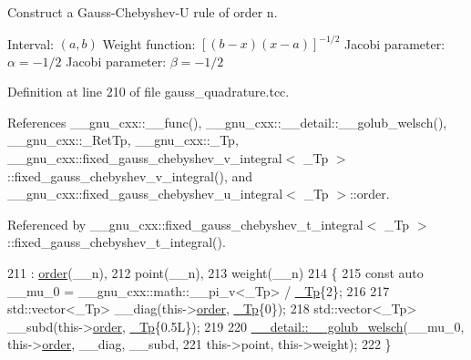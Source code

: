 Construct a Gauss-\/\+Chebyshev-\/U rule of order {\ttfamily n}.

Interval\+: $ (a, b) $ Weight function\+: $ [(b-x)(x-a)]^{-1/2} $ Jacobi parameter\+: $ \alpha = -1/2 $ Jacobi parameter\+: $ \beta = -1/2 $ 

Definition at line 210 of file gauss\+\_\+quadrature.\+tcc.



References \+\_\+\+\_\+gnu\+\_\+cxx\+::\+\_\+\+\_\+func(), \+\_\+\+\_\+gnu\+\_\+cxx\+::\+\_\+\+\_\+detail\+::\+\_\+\+\_\+golub\+\_\+welsch(), \+\_\+\+\_\+gnu\+\_\+cxx\+::\+\_\+\+Ret\+Tp, \+\_\+\+\_\+gnu\+\_\+cxx\+::\+\_\+\+Tp, \+\_\+\+\_\+gnu\+\_\+cxx\+::fixed\+\_\+gauss\+\_\+chebyshev\+\_\+v\+\_\+integral$<$ \+\_\+\+Tp $>$\+::fixed\+\_\+gauss\+\_\+chebyshev\+\_\+v\+\_\+integral(), and \+\_\+\+\_\+gnu\+\_\+cxx\+::fixed\+\_\+gauss\+\_\+chebyshev\+\_\+u\+\_\+integral$<$ \+\_\+\+Tp $>$\+::order.



Referenced by \+\_\+\+\_\+gnu\+\_\+cxx\+::fixed\+\_\+gauss\+\_\+chebyshev\+\_\+t\+\_\+integral$<$ \+\_\+\+Tp $>$\+::fixed\+\_\+gauss\+\_\+chebyshev\+\_\+t\+\_\+integral().


\begin{DoxyCode}
211     : \hyperlink{struct____gnu__cxx_1_1fixed__gauss__chebyshev__u__integral_a497180b192f0df1eb43c488537a861ca}{order}(\_\_n),
212       point(\_\_n),
213       weight(\_\_n)
214     \{
215       \textcolor{keyword}{const} \textcolor{keyword}{auto} \_\_mu\_0 = \_\_gnu\_cxx::math::\_\_pi\_v<\_Tp> / \hyperlink{namespace____gnu__cxx_a3b19a9c800ca194374ef9172290f7d79}{\_Tp}\{2\};
216 
217       std::vector<\_Tp> \_\_diag(this->\hyperlink{struct____gnu__cxx_1_1fixed__gauss__chebyshev__u__integral_a497180b192f0df1eb43c488537a861ca}{order}, \hyperlink{namespace____gnu__cxx_a3b19a9c800ca194374ef9172290f7d79}{\_Tp}\{0\});
218       std::vector<\_Tp> \_\_subd(this->\hyperlink{struct____gnu__cxx_1_1fixed__gauss__chebyshev__u__integral_a497180b192f0df1eb43c488537a861ca}{order}, \hyperlink{namespace____gnu__cxx_a3b19a9c800ca194374ef9172290f7d79}{\_Tp}\{0.5L\});
219 
220       \hyperlink{namespace____gnu__cxx_1_1____detail_aa9f299bb7c04606a9a9aab3ab9e4f4c8}{\_\_detail::\_\_golub\_welsch}(\_\_mu\_0, this->\hyperlink{struct____gnu__cxx_1_1fixed__gauss__chebyshev__u__integral_a497180b192f0df1eb43c488537a861ca}{order}, \_\_diag, \_\_subd,
221                                this->point, this->weight);
222     \}
\end{DoxyCode}


